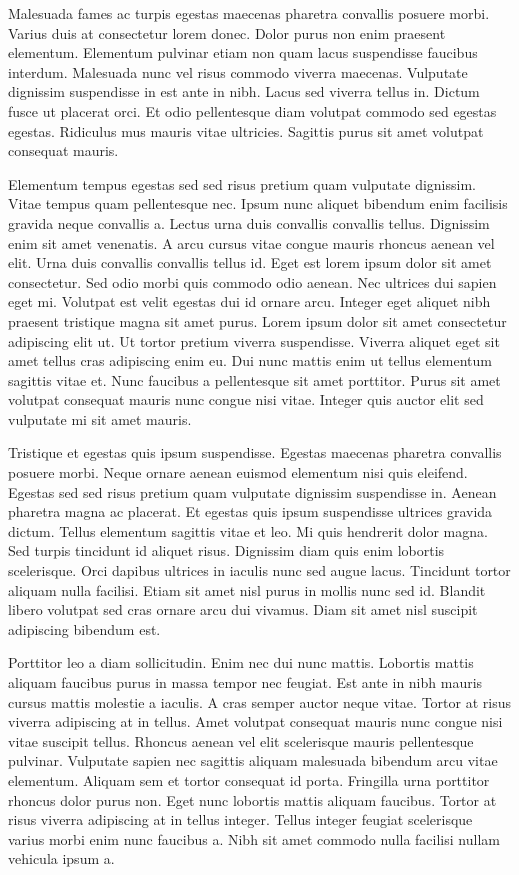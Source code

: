 \documentclass[11pt,a4paper]{article}
\begin{document}
Malesuada fames ac turpis egestas maecenas pharetra convallis posuere morbi. Varius duis at consectetur lorem donec. Dolor purus non enim praesent elementum. Elementum pulvinar etiam non quam lacus suspendisse faucibus interdum. Malesuada nunc vel risus commodo viverra maecenas. Vulputate dignissim suspendisse in est ante in nibh. Lacus sed viverra tellus in. Dictum fusce ut placerat orci. Et odio pellentesque diam volutpat commodo sed egestas egestas. Ridiculus mus mauris vitae ultricies. Sagittis purus sit amet volutpat consequat mauris.

Elementum tempus egestas sed sed risus pretium quam vulputate dignissim. Vitae tempus quam pellentesque nec. Ipsum nunc aliquet bibendum enim facilisis gravida neque convallis a. Lectus urna duis convallis convallis tellus. Dignissim enim sit amet venenatis. A arcu cursus vitae congue mauris rhoncus aenean vel elit. Urna duis convallis convallis tellus id. Eget est lorem ipsum dolor sit amet consectetur. Sed odio morbi quis commodo odio aenean. Nec ultrices dui sapien eget mi. Volutpat est velit egestas dui id ornare arcu. Integer eget aliquet nibh praesent tristique magna sit amet purus. Lorem ipsum dolor sit amet consectetur adipiscing elit ut. Ut tortor pretium viverra suspendisse. Viverra aliquet eget sit amet tellus cras adipiscing enim eu. Dui nunc mattis enim ut tellus elementum sagittis vitae et. Nunc faucibus a pellentesque sit amet porttitor. Purus sit amet volutpat consequat mauris nunc congue nisi vitae. Integer quis auctor elit sed vulputate mi sit amet mauris.

Tristique et egestas quis ipsum suspendisse. Egestas maecenas pharetra convallis posuere morbi. Neque ornare aenean euismod elementum nisi quis eleifend. Egestas sed sed risus pretium quam vulputate dignissim suspendisse in. Aenean pharetra magna ac placerat. Et egestas quis ipsum suspendisse ultrices gravida dictum. Tellus elementum sagittis vitae et leo. Mi quis hendrerit dolor magna. Sed turpis tincidunt id aliquet risus. Dignissim diam quis enim lobortis scelerisque. Orci dapibus ultrices in iaculis nunc sed augue lacus. Tincidunt tortor aliquam nulla facilisi. Etiam sit amet nisl purus in mollis nunc sed id. Blandit libero volutpat sed cras ornare arcu dui vivamus. Diam sit amet nisl suscipit adipiscing bibendum est.

Porttitor leo a diam sollicitudin. Enim nec dui nunc mattis. Lobortis mattis aliquam faucibus purus in massa tempor nec feugiat. Est ante in nibh mauris cursus mattis molestie a iaculis. A cras semper auctor neque vitae. Tortor at risus viverra adipiscing at in tellus. Amet volutpat consequat mauris nunc congue nisi vitae suscipit tellus. Rhoncus aenean vel elit scelerisque mauris pellentesque pulvinar. Vulputate sapien nec sagittis aliquam malesuada bibendum arcu vitae elementum. Aliquam sem et tortor consequat id porta. Fringilla urna porttitor rhoncus dolor purus non. Eget nunc lobortis mattis aliquam faucibus. Tortor at risus viverra adipiscing at in tellus integer. Tellus integer feugiat scelerisque varius morbi enim nunc faucibus a. Nibh sit amet commodo nulla facilisi nullam vehicula ipsum a.
\end{document}
